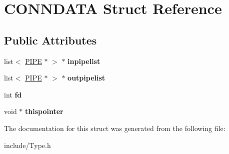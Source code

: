 \hypertarget{structCONNDATA}{}\section{C\+O\+N\+N\+D\+A\+T\+A Struct Reference}
\label{structCONNDATA}
\subsection*{Public Attributes}
\begin{DoxyCompactItemize}
\item 
\hypertarget{structCONNDATA_acb00342a3e9e6c5c258f459025eccfe3}{}list$<$ \hyperlink{classPIPE}{P\+I\+P\+E} $\ast$ $>$ $\ast$ {\bfseries inpipelist}\label{structCONNDATA_acb00342a3e9e6c5c258f459025eccfe3}

\item 
\hypertarget{structCONNDATA_ad69f26f865bba9003884e7676483f14c}{}list$<$ \hyperlink{classPIPE}{P\+I\+P\+E} $\ast$ $>$ $\ast$ {\bfseries outpipelist}\label{structCONNDATA_ad69f26f865bba9003884e7676483f14c}

\item 
\hypertarget{structCONNDATA_a54fe88a540fdc7d88b611c89486b5d49}{}int {\bfseries fd}\label{structCONNDATA_a54fe88a540fdc7d88b611c89486b5d49}

\item 
\hypertarget{structCONNDATA_a0464b9e50f672664894e5f02bbd286ab}{}void $\ast$ {\bfseries thispointer}\label{structCONNDATA_a0464b9e50f672664894e5f02bbd286ab}

\end{DoxyCompactItemize}


The documentation for this struct was generated from the following file\+:\begin{DoxyCompactItemize}
\item 
include/Type.\+h\end{DoxyCompactItemize}

